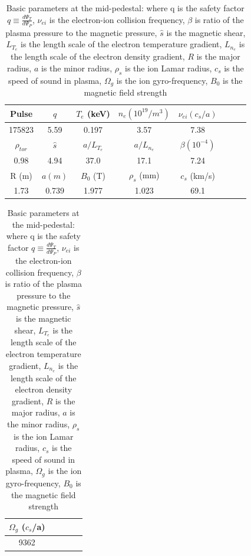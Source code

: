 \documentclass[
 aip,
 amsmath,amssymb,
 reprint
]{revtex4-1}
\begin{document}
\begin{table}[H]
    \centering
    \begin{tabular}{|c|c|c|c|c|c|c|c|}
         \hline
         Pulse & $q$ &  $T_e$ (keV) & $n_e (10^{19}/m^3)$ & $\nu_{ei} (c_s/a)$\\
         \hline
         175823 & 5.59 & 0.197 & 3.57 & 7.38  \\
         \hline \hline
         $\rho_{tor}$ & $\hat{s}$& $a/L_{T_{e}}$ & $a/L_{n_{e}}$ & $\beta(10^{-4})$\\
         \hline
         0.98 & 4.94 & 37.0 & 17.1 & 7.24\\
         \hline \hline
         R (m) & $a(m)$& $B_0$ (T) & $\rho_s$ (mm) & $c_s$ (km/s) \\
         \hline
         1.73 & 0.739 & 1.977 &1.023 & 69.1\\
         \hline
    \end{tabular}
    
    
    \begin{tabular}{|c|c|c|c|c|}
         \hline
         $\Omega_g$ ($c_s$/a)\\
         \hline
         9362\\
         \hline
    \end{tabular}
\caption[font=5]{Basic parameters at the mid-pedestal: where q is the safety factor $q\equiv\frac{d\Psi_{T}}{d\Psi_{P}}$, $\nu_{ei}$ is the electron-ion collision frequency, $\beta$ is ratio of the plasma pressure to the magnetic pressure, $\hat{s}$ is the magnetic shear, $L_{T_e}$ is the length scale of the electron temperature gradient, $L_{n_e}$ is the length scale of the electron density gradient, $R$ is the major radius, $a$ is the minor radius, $\rho_s$ is the ion Lamar radius, $c_s$ is the speed of sound in plasma, $\Omega_g$ is the ion gyro-frequency, $B_0$ is the magnetic field strength}
\label{ch:basic_para}
\end{table}
\end{document}
